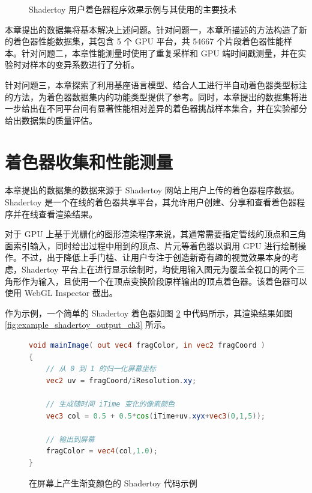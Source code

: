 {\begin{figure}[htbp]
  \caption{Shadertoy 用户\cite{ShdrToyUser1, ShdrToyUser2}着色器程序效果示例与其使用的主要技术}
  \label{fig:shadertoy_gallery_ch3}
\end{figure}


本章提出的数据集将基本解决上述问题。针对问题一，本章所描述的方法构造了新的着色器性能数据集，其包含 5 个 GPU 平台，共 54667 个片段着色器性能样本。针对问题二，本章性能测量时使用了重复采样和 GPU 端时间戳测量，并在实验时对样本的变异系数进行了分析。}{\added 针对问题三，本章探索了利用基座语言模型、结合人工进行半自动着色器类型标注的方法，为着色器数据集内的功能类型提供了参考。同时，本章提出的数据集将进一步给出在不同平台间有显著性能相对差异的着色器挑战样本集合，并在实验部分给出数据集的质量评估。
}

\section{{\amend 着色器收集和性能测量}}

{\added 本章提出的数据集的数据来源于 Shadertoy\cite{Shadertoy} 网站上用户上传的着色器程序数据。} Shadertoy 是一个在线{\added 的着色器共享}平台，{\amend 其}允许用户创建、分享和查看着色器程序{\amend 并在线查看}渲染结果。

{\added 对于 GPU 上基于光栅化的图形渲染程序来说，其通常需要}指定管线的顶点和三角面索引输入，同时给出过程中用到的顶点、片元等着色器{\amend 以调用 GPU 进行绘制操作。}不过，出于降低上手门槛、让用户专注于创造新奇有趣的视觉效果本身的考虑，Shadertoy 平台上在进行显示绘制时，均{\amend 使用输入图元为覆盖全视口的两个三角形作为输入，且使用一个在顶点变换阶段原样输出的顶点着色器。}{\added 该着色器可以使用 WebGL Inspector \cite{WebGLInspector} 截出。}

作为示例，一个简单的 Shadertoy 着色器如图 \ref{fig:example_glsl_shadertoy_code_ch3} 中代码所示，其渲染结果如图 \ref{fig:example_shadertoy_output_ch3} 所示。

\begin{figure}  %
\centering

\begin{lstlisting}[language=GLSL]
void mainImage( out vec4 fragColor, in vec2 fragCoord )
{
    // 从 0 到 1 的归一化屏幕坐标
    vec2 uv = fragCoord/iResolution.xy;

    // 生成随时间 iTime 变化的像素颜色
    vec3 col = 0.5 + 0.5*cos(iTime+uv.xyx+vec3(0,1,5));

    // 输出到屏幕
    fragColor = vec4(col,1.0);
}
\end{lstlisting}
\caption{在屏幕上产生渐变颜色的 Shadertoy 代码示例}
\label{fig:example_glsl_shadertoy_code_ch3}
\end{figure}

